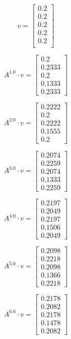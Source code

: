 \documentclass{article}
\begin{document}
    $$v = \begin{bmatrix}
      0.2\\
      0.2\\
      0.2\\
      0.2\\
      0.2\\
      \end{bmatrix}
      $$
      
          $$A^{1.0} \cdot v = \begin{bmatrix}
      0.2\\
      0.2333\\
      0.2\\
      0.1333\\
      0.2333
      \end{bmatrix}
      $$
      
      $$A^{2.0} \cdot v = \begin{bmatrix}
      0.2222\\
      0.2\\
      0.2222\\
      0.1555\\
      0.2
      \end{bmatrix}
      $$
      
      $$A^{3.0} \cdot v = \begin{bmatrix}
      0.2074\\
      0.2259\\
      0.2074\\
      0.1333\\
      0.2259
      \end{bmatrix}
      $$
      
      $$A^{4.0} \cdot v = \begin{bmatrix}
      0.2197\\
      0.2049\\
      0.2197\\
      0.1506\\
      0.2049
      \end{bmatrix}
      $$
      
      $$A^{5.0} \cdot v = \begin{bmatrix}
      0.2098\\
      0.2218\\
      0.2098\\
      0.1366\\
      0.2218
      \end{bmatrix}
      $$
      
      $$A^{6.0} \cdot v = \begin{bmatrix}
      0.2178\\
      0.2082\\
      0.2178\\
      0.1478\\
      0.2082
      \end{bmatrix}
      $$
      
\end{document}
